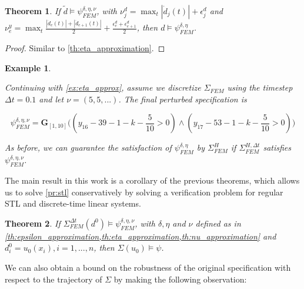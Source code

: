 \documentclass[letterpaper, 10 pt, conference]{ieeeconf/ieeeconf}
\newtheorem{theorem}{Theorem}
\newtheorem{example}{Example}
\newcommand{\Always}{\mathbf{G}}
\begin{document}
\begin{theorem}
    \label{th:nu_approximation}
    If $\tilde d \models \psi^{\delta, \eta, \nu}_{FEM}$, with
    $\nu^d_j = \max_t |\dot d_j(t)| + \epsilon^d_j$ and
    $\nu^y_e = \max_t \frac{|\dot d_e(t)| + |\dot d_{e+1}(t)|}{2} +
    \frac{\epsilon^d_e + \epsilon^d_{e+1}}{2}$, then 
    $d \models \psi^{\delta, \eta}_{FEM}$.
\end{theorem}
\begin{proof}
    Similar to \cref{th:eta_approximation}.
\end{proof}

\begin{example}
    \label{ex:nu_approx}

    Continuing with \cref{ex:eta_approx}, assume we discretize $\Sigma_{FEM}$ using
    the timestep $\Delta t = 0.1$ and let $\nu = (5, 5, ...)$. The final
    perturbed specification is

    \begin{equation}
        \psi^{\delta, \eta, \nu}_{FEM} = \Always_{[1,10]} \bigl(
            (y_{16} - 39 - 1 - k - \frac{5}{10} > 0) \land (y_{17} - 53 - 1 - k
            - \frac{5}{10} > 0)
        \bigr)
    \end{equation}

    As before, we can guarantee the satisfaction of $\psi^{\delta,
    \eta}_{FEM}$ by $\Sigma^H_{FEM}$ if $\Sigma_{FEM}^{H, \Delta t}$ satisfies
    $\psi^{\delta, \eta, \nu}_{FEM}$.
    
\end{example}

The main result in this work is a corollary of the previous theorems, which
allows us to solve \cref{pr:stl}
conservatively by solving a verification problem for regular STL and discrete-time
linear systems. 

\begin{theorem}
    If $\Sigma_{FEM}^{\Delta t}(d^0) \models \psi^{\delta, \eta, \nu}_{FEM}$, with $\delta, \eta$
    and $\nu$ defined as in \cref{th:epsilon_approximation,th:eta_approximation,th:nu_approximation}
    and $d^0_i = u_0(x_i), i = 1,...,n$, then $\Sigma(u_0) \models \psi$.
\end{theorem}

We can also obtain a bound on the robustness of the
original specification with respect to the trajectory of $\Sigma$ by making the
following observation:
\end{document}
